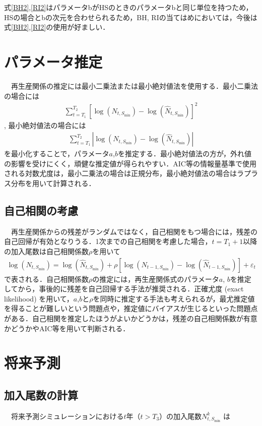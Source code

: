 \documentclass[11pt]{jsarticle}
\begin{document}
式\ref{BH2},\ref{RI2}はパラメータbがHSのときのパラメータbと同じ単位を持つため，HSの場合とbの次元を合わせられるため，BH, RIの当てはめにおいては，今後は式\ref{BH2},\ref{RI2}の使用が好ましい．

\section{パラメータ推定}
　再生産関係の推定には最小二乗法または最小絶対値法を使用する．最小二乗法の場合には
\begin{eqnarray}
  \sum_{t=T_1}^{T_2} [ \log (N_{t,S_{\mathrm{min}}}) - \log (\hat{N}_{t,S_{\mathrm{min}}}) ]^2   
\end{eqnarray}
, 最小絶対値法の場合には
\begin{eqnarray}
  \sum_{t=T_1}^{T_2} | \log (N_{t,S_{\mathrm{min}}}) - \log (\hat{N}_{t,S_{\mathrm{min}}}) |
\end{eqnarray}
を最小化することで，パラメータ$a$,$b$を推定する．最小絶対値法の方が，外れ値の影響を受けにくく，頑健な推定値が得られやすい．AIC等の情報量基準で使用される対数尤度は，最小二乗法の場合は正規分布，最小絶対値法の場合はラプラス分布を用いて計算される．

\subsection{自己相関の考慮}
　再生産関係からの残差がランダムではなく，自己相関をもつ場合には，残差の自己回帰が有効となりうる．1次までの自己相関を考慮した場合，$t=T_1+1$以降の加入尾数は自己相関係数$\rho$を用いて
\begin{eqnarray}
  \log (N_{t,S_{\mathrm{min}}}) = \log (\hat{N}_{t,S_{\mathrm{min}}}) + \rho [ \log (N_{t-1,S_{\mathrm{min}}})-\log(\hat{N}_{t-1,S_{\mathrm{min}}}) ] + \varepsilon_t
\end{eqnarray}
で表される\cite{thorson}\cite{johnson}．自己相関係数$\rho$の推定には，再生産関係式のパラメータ$a$, $b$を推定してから，事後的に残差を自己回帰する手法が推奨される．正確尤度 (exact likelihood) を用いて，$a$,$b$と$\rho$を同時に推定する手法も考えられるが，最尤推定値を得ることが難しいという問題点や，推定値にバイアスが生じるといった問題点がある\cite{johnson}．自己相関を推定したほうがよいかどうかは，残差の自己相関係数が有意かどうかやAIC等を用いて判断される．

\section{将来予測}
\subsection{加入尾数の計算}
　将来予測シミュレーションにおける$t$年（$t>T_3$）の加入尾数$N_{t,S_{\mathrm{min}}}^k$ は
\end{document}

